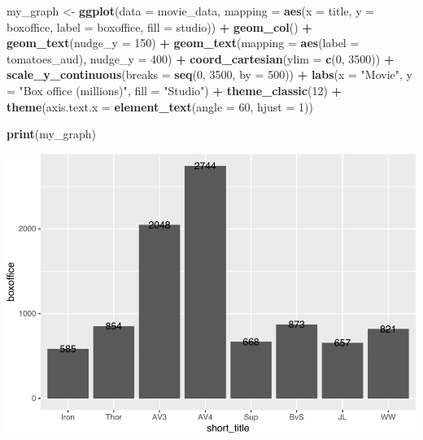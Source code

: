 \documentclass[
]{krantz}
\makeatletter
\newenvironment{Shaded}{\begin{snugshade}}{\end{snugshade}}
\newcommand{\DataTypeTok}[1]{\textcolor[rgb]{0.27,0.27,0.27}{#1}}
\newcommand{\DecValTok}[1]{\textcolor[rgb]{0.06,0.06,0.06}{#1}}
\newcommand{\KeywordTok}[1]{\textcolor[rgb]{0.27,0.27,0.27}{\textbf{#1}}}
\newcommand{\NormalTok}[1]{#1}
\newcommand{\OperatorTok}[1]{\textcolor[rgb]{0.43,0.43,0.43}{\textbf{#1}}}
\newcommand{\StringTok}[1]{\textcolor[rgb]{0.5,0.5,0.5}{#1}}
\newenvironment{kframe}{%
\medskip{}
\setlength{\fboxsep}{.8em}
 \def\at@end@of@kframe{}%
 \ifinner\ifhmode%
  \def\at@end@of@kframe{\end{minipage}}%
  \begin{minipage}{\columnwidth}%
 \fi\fi%
 \def\FrameCommand##1{\hskip\@totalleftmargin \hskip-\fboxsep
 \colorbox{shadecolor}{##1}\hskip-\fboxsep
     \hskip-\linewidth \hskip-\@totalleftmargin \hskip\columnwidth}%
 \MakeFramed {\advance\hsize-\width
   \@totalleftmargin\z@ \linewidth\hsize
   \@setminipage}}%
 {\par\unskip\endMakeFramed%
 \at@end@of@kframe}
\renewenvironment{Shaded}{\begin{kframe}}{\end{kframe}}
\makeatother
\begin{document}
\begin{Shaded}
\begin{Highlighting}[]
\NormalTok{my_graph <-}\StringTok{ }\KeywordTok{ggplot}\NormalTok{(}\DataTypeTok{data =}\NormalTok{ movie_data,}
           \DataTypeTok{mapping =} \KeywordTok{aes}\NormalTok{(}\DataTypeTok{x =}\NormalTok{ title,}
                         \DataTypeTok{y =}\NormalTok{ boxoffice,}
                         \DataTypeTok{label =}\NormalTok{ boxoffice, }
                         \DataTypeTok{fill =}\NormalTok{ studio)) }\OperatorTok{+}
\StringTok{  }\KeywordTok{geom_col}\NormalTok{() }\OperatorTok{+}
\StringTok{  }\KeywordTok{geom_text}\NormalTok{(}\DataTypeTok{nudge_y =} \DecValTok{150}\NormalTok{)  }\OperatorTok{+}
\StringTok{  }\KeywordTok{geom_text}\NormalTok{(}\DataTypeTok{mapping =} \KeywordTok{aes}\NormalTok{(}\DataTypeTok{label =}\NormalTok{ tomatoes_aud), }
            \DataTypeTok{nudge_y =} \DecValTok{400}\NormalTok{) }\OperatorTok{+}
\StringTok{  }\KeywordTok{coord_cartesian}\NormalTok{(}\DataTypeTok{ylim =} \KeywordTok{c}\NormalTok{(}\DecValTok{0}\NormalTok{, }\DecValTok{3500}\NormalTok{)) }\OperatorTok{+}
\StringTok{  }\KeywordTok{scale_y_continuous}\NormalTok{(}\DataTypeTok{breaks =} \KeywordTok{seq}\NormalTok{(}\DecValTok{0}\NormalTok{, }\DecValTok{3500}\NormalTok{, }\DataTypeTok{by =} \DecValTok{500}\NormalTok{)) }\OperatorTok{+}
\StringTok{  }\KeywordTok{labs}\NormalTok{(}\DataTypeTok{x =} \StringTok{"Movie"}\NormalTok{,}
       \DataTypeTok{y =} \StringTok{"Box office (millions)"}\NormalTok{,}
       \DataTypeTok{fill =} \StringTok{"Studio"}\NormalTok{) }\OperatorTok{+}
\StringTok{  }\KeywordTok{theme_classic}\NormalTok{(}\DecValTok{12}\NormalTok{) }\OperatorTok{+}
\StringTok{  }\KeywordTok{theme}\NormalTok{(}\DataTypeTok{axis.text.x =} \KeywordTok{element_text}\NormalTok{(}\DataTypeTok{angle =} \DecValTok{60}\NormalTok{, }
                                   \DataTypeTok{hjust =} \DecValTok{1}\NormalTok{))  }

\KeywordTok{print}\NormalTok{(my_graph)}
\end{Highlighting}
\end{Shaded}

\includegraphics{bookdown_files/figure-latex/unnamed-chunk-257-1.pdf}
\end{document}

